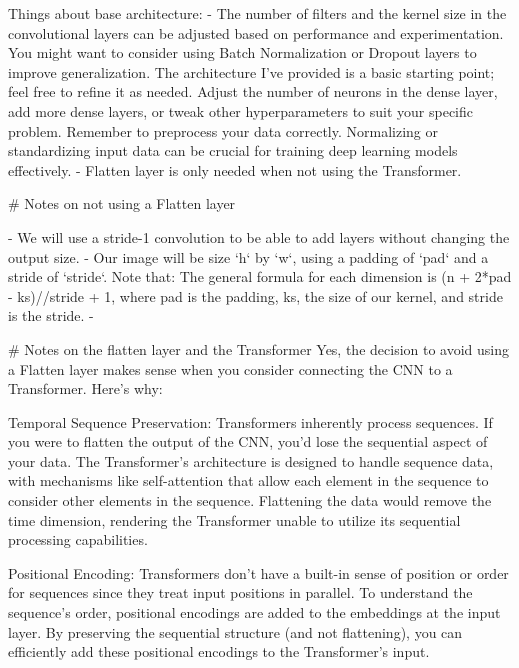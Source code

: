 Things about base architecture: 
    -   The number of filters and the kernel size in the convolutional layers can be adjusted based on performance and experimentation.
    You might want to consider using Batch Normalization or Dropout layers to improve generalization.
    The architecture I've provided is a basic starting point; feel free to refine it as needed. Adjust the number of neurons in the dense layer, add more dense layers, or tweak other hyperparameters to suit your specific problem.
    Remember to preprocess your data correctly. Normalizing or standardizing input data can be crucial for training deep learning models effectively.
    - Flatten layer is only needed when not using the Transformer. 






# Notes on not using a Flatten layer



- We will use a stride-1 convolution to be able to add layers without changing the output size. 
- Our image will be size `h` by `w`, using a padding of `pad` and a stride of `stride`. Note that: The general formula for each dimension is (n + 2*pad - ks)//stride + 1, where pad is the padding, ks, the size of our kernel, and stride is the stride.
- 







# Notes on the flatten layer and the Transformer
Yes, the decision to avoid using a Flatten layer makes sense when you consider connecting the CNN to a Transformer. Here's why:

    Temporal Sequence Preservation: Transformers inherently process sequences. If you were to flatten the output of the CNN, you'd lose the sequential aspect of your data. The Transformer's architecture is designed to handle sequence data, with mechanisms like self-attention that allow each element in the sequence to consider other elements in the sequence. Flattening the data would remove the time dimension, rendering the Transformer unable to utilize its sequential processing capabilities.

    Positional Encoding: Transformers don't have a built-in sense of position or order for sequences since they treat input positions in parallel. To understand the sequence's order, positional encodings are added to the embeddings at the input layer. By preserving the sequential structure (and not flattening), you can efficiently add these positional encodings to the Transformer's input.

